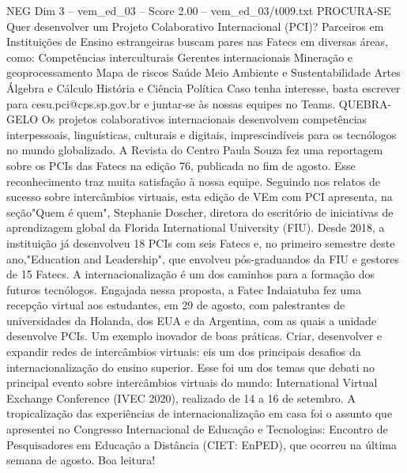 \begin{textsample}{NEG Dim 3 – vem\_ed\_03 – Score 2.00 – vem\_ed\_03/t009.txt}  \label{ex:f3_neg_081}
PROCURA-SE Quer desenvolver um Projeto Colaborativo Internacional (PCI)?
Parceiros em Instituições de Ensino estrangeiras buscam pares nas Fatecs em diversas áreas, como: Competências interculturais Gerentes internacionais Mineração e geoprocessamento Mapa de riscos Saúde Meio Ambiente e Sustentabilidade Artes Álgebra e Cálculo História e Ciência Política Caso tenha interesse, basta escrever para cesu.pci@cps.sp.gov.br e juntar-se às nossas equipes no Teams.
QUEBRA-GELO Os projetos colaborativos internacionais desenvolvem competências interpessoais, linguísticas, culturais e digitais, imprescindíveis para os tecnólogos no mundo globalizado.
A Revista do Centro Paula Souza fez uma reportagem sobre os PCIs das Fatecs na edição 76, publicada no fim de agosto.
Esse reconhecimento traz muita satisfação à nossa equipe.
Seguindo nos relatos de sucesso sobre intercâmbios virtuais, esta edição de VEm com PCI apresenta, na seção"Quem é quem", Stephanie Doscher, diretora do escritório de iniciativas de aprendizagem global da Florida International University (FIU).
Desde 2018, a instituição já desenvolveu 18 PCIs com seis Fatecs e, no primeiro semestre deste ano,"Education and Leadership", que envolveu pós-graduandos da FIU e gestores de 15 Fatecs.
A internacionalização é um dos caminhos para a formação dos futuros tecnólogos.
Engajada nessa proposta, a Fatec Indaiatuba fez uma recepção virtual aos estudantes, em 29 de agosto, com palestrantes de universidades da Holanda, dos EUA e da Argentina, com as quais a unidade desenvolve PCIs.
Um exemplo inovador de boas práticas.
Criar, desenvolver e expandir redes de intercâmbios virtuais: eis um dos principais desafios da internacionalização do ensino superior.
Esse foi um dos temas que debati no principal evento sobre intercâmbios virtuais do mundo: International Virtual Exchange Conference (IVEC 2020), realizado de 14 a 16 de setembro.
A tropicalização das experiências de internacionalização em casa foi o assunto que apresentei no Congresso Internacional de Educação e Tecnologias: Encontro de Pesquisadores em Educação a Distância (CIET: EnPED), que ocorreu na última semana de agosto.
Boa leitura!

\end{textsample}
